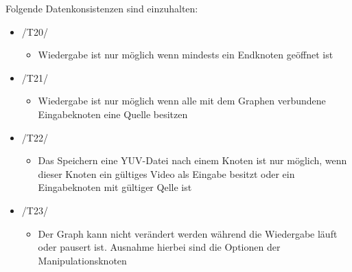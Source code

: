 \newpage
Folgende Datenkonsistenzen sind einzuhalten:
\begin{itemize}
	\item /T20/
		\begin{itemize}
			\item Wiedergabe ist nur möglich wenn mindests ein Endknoten geöffnet ist
		\end{itemize}
	\item /T21/
		\begin{itemize}
			\item Wiedergabe ist nur möglich wenn alle mit dem Graphen verbundene Eingabeknoten eine Quelle besitzen
		\end{itemize}
	\item /T22/
		\begin{itemize}
			\item Das Speichern eine YUV-Datei nach einem Knoten ist nur möglich, wenn dieser Knoten ein gültiges Video als Eingabe besitzt oder ein Eingabeknoten mit 
			gültiger Qelle ist
		\end{itemize}
	\item /T23/
		\begin{itemize}
			\item Der Graph kann nicht verändert werden während die Wiedergabe läuft oder pausert ist. Ausnahme hierbei sind die Optionen der Manipulationsknoten
		\end{itemize}
	\end{itemize}
